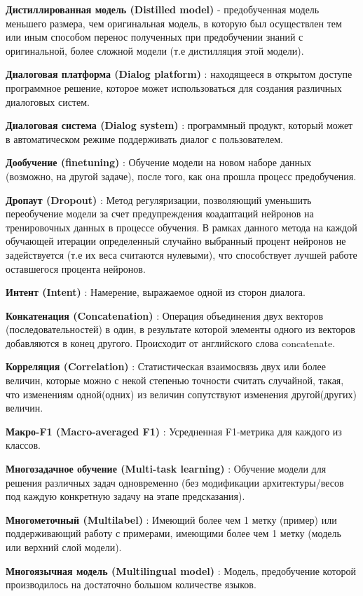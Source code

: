 \textbf{Дистиллированная модель (Distilled model)} - предобученная модель меньшего размера, чем оригинальная модель, в которую был осуществлен тем или иным способом перенос полученных при предобучении знаний с оригинальной, более сложной модели (т.е дистилляция этой модели).

\textbf{Диалоговая платформа (Dialog platform)} : находящееся в открытом доступе программное решение, которое может использоваться для создания различных диалоговых систем.

\textbf{Диалоговая система (Dialog system)} : программный продукт, который может в автоматическом режиме поддерживать диалог с пользователем.

\textbf{Дообучение (finetuning)} : Обучение модели на новом наборе данных (возможно, на другой задаче), после того, как она прошла процесс предобучения.

\textbf{Дропаут (Dropout)} : Метод регуляризации, позволяющий уменьшить переобучение модели за счет предупреждения коадаптаций нейронов на тренировочных данных в процессе обучения. В рамках данного метода на каждой обучающей итерации определенный случайно выбранный процент нейронов не задействуется (т.е их веса считаются нулевыми), что способствует лучшей работе оставшегося процента нейронов. 

\textbf{Интент (Intent)} : Намерение, выражаемое одной из сторон диалога.

\textbf{Конкатенация (Concatenation)} : Операция объединения двух векторов (последовательностей) в один, в результате которой элементы одного из векторов добавляются в конец другого. Происходит от английского слова concatenate.

\textbf{Корреляция (Correlation)} : Статистическая взаимосвязь двух или более величин, которые можно с некой степенью точности считать случайной, такая, что изменениям одной(одних) из величин сопутствуют изменения другой(других) величин.

\textbf{Макро-F1 (Macro-averaged F1)} : Усредненная F1-метрика для каждого из классов.

\textbf{Многозадачное обучение (Multi-task learning)} : Обучение модели для решения различных задач одновременно (без модификации архитектуры/весов под каждую конкретную задачу на этапе предсказания).

\textbf{Многометочный (Multilabel)} : Имеющий более чем 1 метку (пример) или поддерживающий работу с примерами, имеющими более чем 1 метку (модель или верхний слой модели).

\textbf{Многоязычная модель (Multilingual model)} : Модель, предобучение которой производилось на достаточно большом количестве языков.

